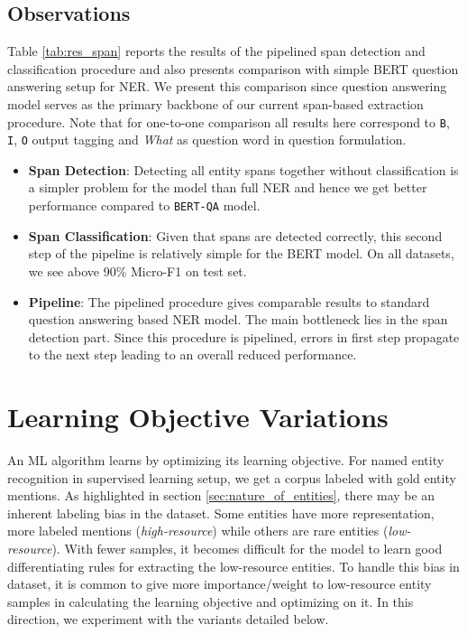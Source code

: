 \subsection{Observations}
Table \ref{tab:res_span} reports the results of the pipelined span detection and classification procedure and also presents comparison with simple BERT question answering setup for NER. We present this comparison since question answering model serves as the primary backbone of our current span-based extraction procedure. Note that for one-to-one comparison all results here correspond to \texttt{B}, \texttt{I}, \texttt{O} output tagging and \textit{What} as question word in question formulation.

\begin{itemize}
    \item \textbf{Span Detection}: Detecting all entity spans together without classification is a simpler problem for the model than full NER and hence we get better performance compared to \texttt{BERT-QA} model.
    
    \item \textbf{Span Classification}: Given that spans are detected correctly, this second step of the pipeline is relatively simple for the BERT model. On all datasets, we see above 90\% Micro-F1 on test set.
    
    \item \textbf{Pipeline}: The pipelined procedure gives comparable results to standard question answering based NER model. The main bottleneck lies in the span detection part. Since this procedure is pipelined, errors in first step propagate to the next step leading to an overall reduced performance.
\end{itemize}

\section{Learning Objective Variations}
An ML algorithm learns by optimizing its learning objective. For named entity recognition in supervised learning setup, we get a corpus labeled with gold entity mentions. As highlighted in section \ref{sec:nature_of_entities}, there may be an inherent labeling bias in the dataset. Some entities have more representation, more labeled mentions (\textit{high-resource}) while others are rare entities (\textit{low-resource}). With fewer samples, it becomes difficult for the model to learn good differentiating rules for extracting the low-resource entities. To handle this bias in dataset, it is common to give more importance/weight to low-resource entity samples in calculating the learning objective and optimizing on it. In this direction, we experiment with the variants detailed below.

